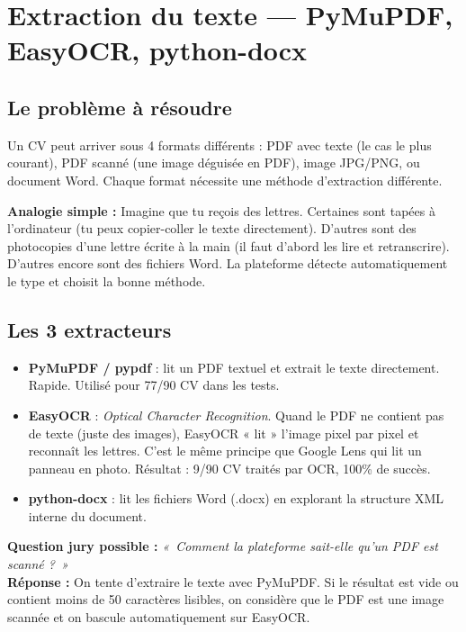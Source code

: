 \documentclass[12pt,a4paper]{article}
\newenvironment{simplification}{%
  \def\FrameCommand{\fboxsep=8pt\colorbox{green!10}}%
  \MakeFramed{\advance\hsize-\width \FrameRestore}%
  \vspace{-4pt}%
}{\endMakeFramed}
\newenvironment{jury}{%
  \def\FrameCommand{\fboxsep=8pt\colorbox{orange!12}}%
  \MakeFramed{\advance\hsize-\width \FrameRestore}%
  \vspace{-4pt}%
}{\endMakeFramed}
\newcommand{\concept}[1]{\textbf{\color{bleu}#1}}
\begin{document}
\newpage

\section{Extraction du texte — PyMuPDF, EasyOCR, python-docx}

\subsection{Le problème à résoudre}

Un CV peut arriver sous 4 formats différents : PDF avec texte (le cas le plus courant), PDF scanné (une image déguisée en PDF), image JPG/PNG, ou document Word. Chaque format nécessite une méthode d'extraction différente.

\begin{simplification}
\textbf{Analogie simple :}
Imagine que tu reçois des lettres. Certaines sont tapées à l'ordinateur (tu peux copier-coller le texte directement). D'autres sont des photocopies d'une lettre écrite à la main (il faut d'abord les lire et retranscrire). D'autres encore sont des fichiers Word. La plateforme détecte automatiquement le type et choisit la bonne méthode.
\end{simplification}

\subsection{Les 3 extracteurs}

\begin{itemize}
  \item \concept{PyMuPDF / pypdf} : lit un PDF textuel et extrait le texte directement. Rapide. Utilisé pour 77/90 CV dans les tests.
  \item \concept{EasyOCR} : \textit{Optical Character Recognition}. Quand le PDF ne contient pas de texte (juste des images), EasyOCR « lit » l'image pixel par pixel et reconnaît les lettres. C'est le même principe que Google Lens qui lit un panneau en photo. Résultat : 9/90 CV traités par OCR, 100\% de succès.
  \item \concept{python-docx} : lit les fichiers Word (.docx) en explorant la structure XML interne du document.
\end{itemize}

\begin{jury}
\textbf{Question jury possible :} \textit{«~Comment la plateforme sait-elle qu'un PDF est scanné ?~»}\\[4pt]
\textbf{Réponse :} On tente d'extraire le texte avec PyMuPDF. Si le résultat est vide ou contient moins de 50 caractères lisibles, on considère que le PDF est une image scannée et on bascule automatiquement sur EasyOCR.
\end{jury}
\end{document}
